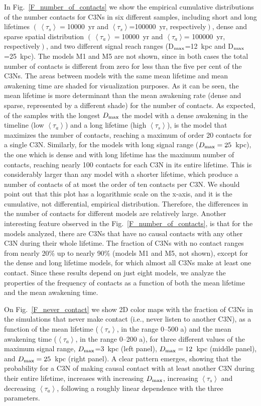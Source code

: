 \documentclass[crop]{CSLB}
\newcommand{\ceti}{C3N}
\newcommand{\cetis}{C3Ns}
\newcommand{\ffn}[1]{}
\begin{document}
\ffn{3}
%
In Fig.~\ref{F_number_of_contacts} we show the empirical cumulative
distributions of the number contacts for \cetis{} in six different
samples, including short and long lifetimes
$\left(\,\left<\tau_s\right>=\right.$10000~yr and
$\left<\tau_s\right>$=100000~yr, respectively$\left.\right)$, dense
and sparse spatial distribution
$\left(\,\left<\tau_a\right>=\right.$10000~yr and
$\left<\tau_a\right>$= 100000~yr, respectively$\left.\right)$, and two
different signal reach ranges (D$_{\rm max}$=12~kpc and
D$_{\rm max}$=25~kpc).
%
The models M1 and M5 are not shown, since in both cases the total
number of contacts is different from zero for less than the five per
cent of the \cetis{}.
%
The areas between models with the same mean lifetime and mean
awakening time are shaded for visualization purposes.
%
As it can be seen, the mean lifetime is more
determinant than the mean awakening rate (dense and sparse,
represented by a different shade) for the number of contacts.
%
As expected, of the samples with the longest $D_{\rm max}$ the model with
a dense awakening in the timeline (low $\left<\tau_a\right>$) and a
long lifetime (high $\left<\tau_s\right>$), is the model that
maximizes the number of contacts, reaching a maximum of order 20
contacts for a single \ceti{}.
%
Similarly, for the models with long signal range
($D_{\rm max}=25$~kpc), the one which is dense and with long lifetime
has the maximum number of contacts, reaching nearly 100 contacts for
each \ceti{} in its entire lifetime.
%
This is considerably larger than any model with a shorter lifetime,
which produce a number of contacts of at most the order of ten
contacts per \ceti{}.
%
We should point out that this plot 
has a logarithmic scale on the x-axis, and it is the cumulative, not
differential, empirical distribution.
%
Therefore, the differences in the
number of contacts for different models are relatively large.
%
Another interesting feature observed in the Fig.~\ref{F_number_of_contacts}, is that for the
models analyzed, there are \cetis{} that have no causal contacts with
any other \ceti{} during their whole lifetime.
%
The fraction of \cetis{} with no contact ranges from nearly 20\% up to
nearly 90\% (models M1 and M5, not shown), except for the dense and
long lifetime models, for which almost all \cetis{} make at least one
contact.
%
Since these results depend on just eight models, we analyze the
properties of the frequency of contacts as a function of both the mean
lifetime and the mean awakening time.
%
\ffn{4}
%
On Fig.~\ref{F_never_contact} we show 2D color maps with the fraction
of \cetis{} in the simulations that never make contact (i.e., never
listen to another \ceti{}), as a function of the mean lifetime
($\left<\tau_s\right>$, in the range 0--500 a) and the mean awakening
time ($\left<\tau_a\right>$, in the range 0--200 a), for three
different values of the maximum signal range, $D_{\rm max}$=3~kpc (left
panel), $D_{\rm max}=12$~kpc (middle panel), and $D_{\rm max}=25$~kpc
(right panel).
%
A clear pattern emerges, showing that the probability
for a \ceti{} of making causal contact with at least another \ceti{}
during their entire lifetime, increases with increasing $D_{\rm max}$,
increasing $\left<\tau_s\right>$ and decreasing $\left<\tau_a\right>$,
following a roughly linear dependence with the three parameters.
\end{document}
